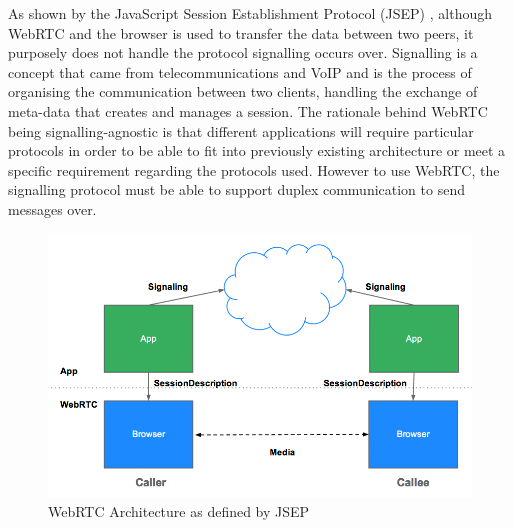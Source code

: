 \documentclass[]{report}
\begin{document}
	As shown by the JavaScript Session Establishment Protocol (JSEP) \cite{JSEP}, although WebRTC and the browser is used to transfer the data between two peers, it purposely does not handle the protocol signalling occurs over. Signalling is a concept that came from telecommunications and VoIP and is the process of organising the communication between two clients, handling the exchange of meta-data that creates and manages a session. The rationale behind WebRTC being signalling-agnostic is that different applications will require particular protocols in order to be able to fit into previously existing architecture or meet a specific requirement regarding the protocols used. However to use WebRTC, the signalling protocol must be able to support duplex communication to send messages over.
	
	\begin{figure}[H]
		\centering
		\caption{WebRTC Architecture as defined by JSEP \cite{JSEP}}
		\includegraphics[scale=0.4]{jsep.png}
	\end{figure}
	
\end{document}
